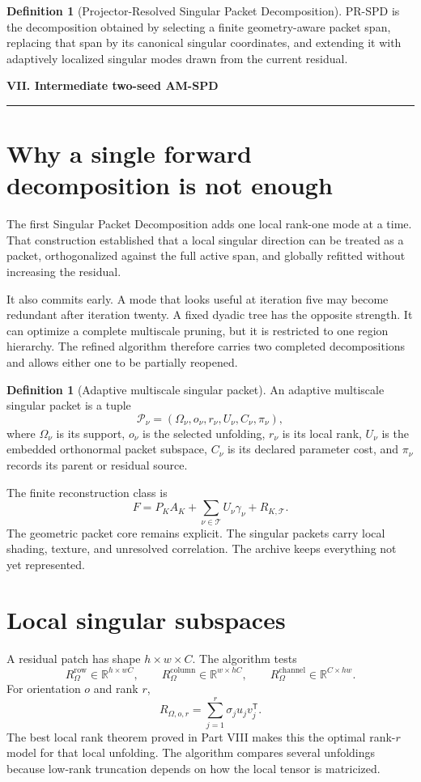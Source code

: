 \documentclass[11pt]{article}
\theoremstyle{definition}
\newtheorem{definition}[theorem]{Definition}
\theoremstyle{remark}
\newcommand{\R}{\mathbb R}
\newcommand{\InlinePart}[1]{%
  \Needspace{15\baselineskip}%
  \vspace{1.5em}%
  {\color{Blue}\LARGE\bfseries #1\par}%
  \vspace{0.55em}%
  {\color{Blue}\rule{\linewidth}{1.1pt}}\par%
  \vspace{0.75em}%
}
\begin{document}
\begin{definition}[Projector-Resolved Singular Packet Decomposition]
PR-SPD is the decomposition obtained by selecting a finite geometry-aware packet span, replacing that span by its canonical singular coordinates, and extending it with adaptively localized singular modes drawn from the current residual.
\end{definition}

\InlinePart{VII. Intermediate two-seed AM-SPD}

\section{Why a single forward decomposition is not enough}
The first Singular Packet Decomposition adds one local rank-one mode at a time. That construction established that a local singular direction can be treated as a packet, orthogonalized against the full active span, and globally refitted without increasing the residual.

It also commits early. A mode that looks useful at iteration five may become redundant after iteration twenty. A fixed dyadic tree has the opposite strength. It can optimize a complete multiscale pruning, but it is restricted to one region hierarchy. The refined algorithm therefore carries two completed decompositions and allows either one to be partially reopened.

\begin{definition}[Adaptive multiscale singular packet]
An adaptive multiscale singular packet is a tuple
\[
\mathcal P_\nu=(\Omega_\nu,o_\nu,r_\nu,U_\nu,C_\nu,\pi_\nu),
\]
where $\Omega_\nu$ is its support, $o_\nu$ is the selected unfolding, $r_\nu$ is its local rank, $U_\nu$ is the embedded orthonormal packet subspace, $C_\nu$ is its declared parameter cost, and $\pi_\nu$ records its parent or residual source.
\end{definition}

The finite reconstruction class is
\[
\boxed{
F=P_KA_K+\sum_{\nu\in\mathcal T}U_\nu\gamma_\nu+R_{K,\mathcal T}.
}
\]
The geometric packet core remains explicit. The singular packets carry local shading, texture, and unresolved correlation. The archive keeps everything not yet represented.

\section{Local singular subspaces}
A residual patch has shape $h\times w\times C$. The algorithm tests
\[
R_\Omega^{\mathrm{row}}\in\R^{h\times wC},
\qquad
R_\Omega^{\mathrm{column}}\in\R^{w\times hC},
\qquad
R_\Omega^{\mathrm{channel}}\in\R^{C\times hw}.
\]
For orientation $o$ and rank $r$,
\[
R_{\Omega,o,r}=\sum_{j=1}^{r}\sigma_j u_jv_j^{\mathsf T}.
\]
The best local rank theorem proved in Part VIII makes this the optimal rank-$r$ model for that local unfolding. The algorithm compares several unfoldings because low-rank truncation depends on how the local tensor is matricized.
\end{document}

